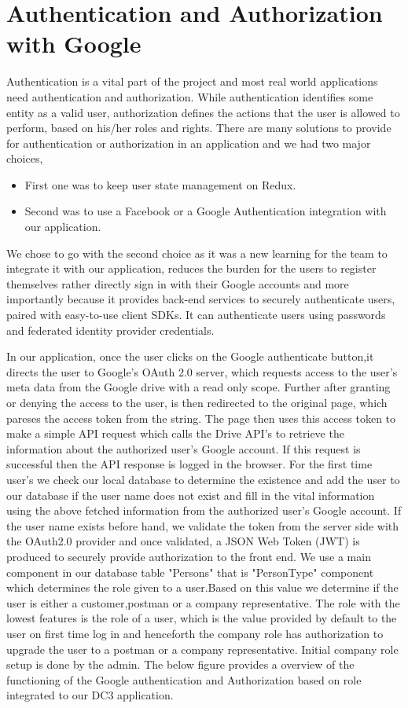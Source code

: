 \section{Authentication and Authorization with Google}
Authentication is a vital part of the project and most real world applications need authentication and authorization. While authentication identifies some entity as a valid user, authorization defines the actions that the user is allowed to perform, based on his/her roles and rights. There are many solutions to provide for authentication or authorization in an application and we had two major choices,

\begin{itemize}
\item First one was to keep user state management on Redux.
\item Second was to use a Facebook or a Google Authentication integration with our application.
\end{itemize}

We chose to go with the second choice as it was a new learning for the team to integrate it with our application, reduces the burden for the users to register themselves rather directly sign in with their Google accounts and more importantly because it provides back-end services to securely authenticate users, paired with easy-to-use client SDKs. It can authenticate users using passwords and federated identity provider credentials. 

In our application, once the user clicks on the Google authenticate button,it directs the user to Google's OAuth 2.0 server, which requests access to the user's meta data from the Google drive with a read only scope. Further after granting or denying the access to the user, is then redirected to the original page, which pareses the access token from the string. The page then uses this access token to make  a simple API request which calls the Drive API's to retrieve the information about the authorized user's Google account. If this request is successful then the API response is logged in the browser.
For the first time user's we check our local database to determine the existence and add the user to our database if the user name does not exist and fill in the vital information using the above fetched information from the authorized user's Google account. If the user name exists before hand, we validate the token from the server side with the OAuth2.0 provider and once validated, a JSON Web Token (JWT)  is produced to securely provide authorization to the front end.
We use a main component in our database table "Persons" that is "PersonType" component which determines the role given to a user.Based on this value we determine if the user is either a customer,postman or a company representative. The role with the lowest features is the role of a user, which is the value provided by default to the user on first time log in and henceforth the company role has  authorization to upgrade the user to a postman or a company representative. Initial company role setup is done by the admin. The below figure provides a overview of the functioning of the Google authentication and Authorization based on role integrated to our DC3 application.

